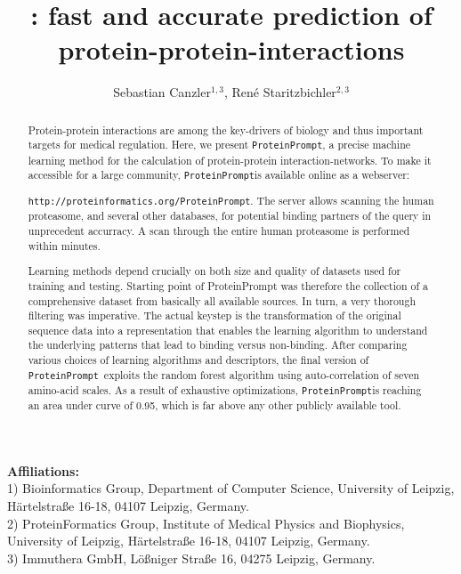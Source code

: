 \documentclass{article}
\title{\tool: fast and accurate prediction of protein-protein-interactions}
\author{ Sebastian Canzler$^{1,3}$, Ren\'{e} Staritzbichler$^{2,3}$}
\date{}
\newcommand{\url}[1]{\texttt{http://\small #1}}
\newcommand{\tool}{\texttt{ProteinPrompt}}
\newcommand{\website}{\url{proteinformatics.org/\tool}}
\begin{document}
\maketitle


\begin{abstract}

  Protein-protein interactions are among the key-drivers of biology and thus important targets for medical regulation. 
  Here, we present \tool, a precise machine learning method for the calculation of protein-protein interaction-networks.
  To make it accessible for a large community, \tool is available online as a webserver:

  \noindent \website.
  The server allows scanning the human proteasome, and several other databases, for potential binding partners of the query in unprecedent accurracy.
  A scan through the entire human proteasome is performed within minutes.
  

  Learning methods depend crucially on both size and quality of datasets used for training and testing.
  Starting point of ProteinPrompt was therefore the collection of a comprehensive
  dataset from basically all available sources.
  In turn, a very thorough filtering was imperative.
  The actual keystep is the transformation of the original sequence data into a representation that enables the learning
  algorithm to understand the underlying patterns that lead to binding versus non-binding.
  After comparing various choices of learning algorithms and descriptors, the final version of \tool\ exploits the random forest algorithm using auto-correlation of seven amino-acid scales.
  As a result of exhaustive optimizations, \tool is reaching an area under curve of 0.95, which is far above any other publicly available tool.

\end{abstract}



\noindent\textbf{Affiliations:}\\
  { 1) Bioinformatics Group, Department of Computer Science,
  University of Leipzig,
  H{\"a}rtelstra{\ss}e 16-18, 04107 Leipzig, Germany.\\
2) ProteinFormatics Group, Institute of Medical Physics and Biophysics, University of Leipzig,
  H{\"a}rtelstra{\ss}e 16-18, 04107 Leipzig, Germany.\\
3)
Immuthera GmbH, L{\"o}{\ss}niger Stra{\ss}e 16, 04275 Leipzig, Germany.}
\end{document}
